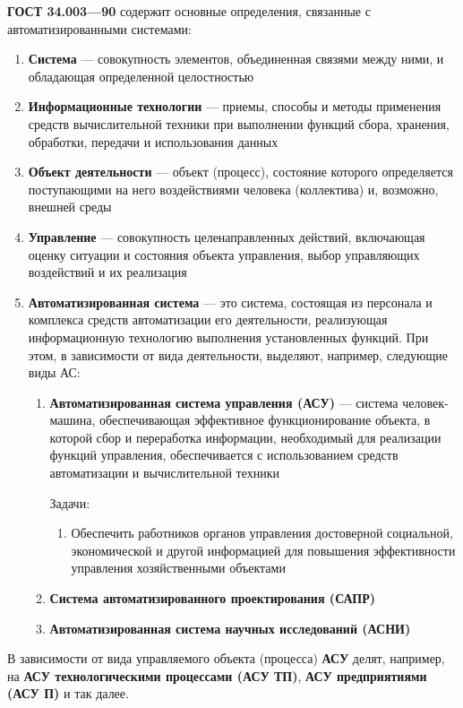 \documentclass{article}
\begin{document}
\textbf{ГОСТ 34.003—90} содержит основные определения, связанные с автоматизированными системами:

\begin{enumerate}
    \item \textbf{Система} — совокупность элементов, объединенная связями между ними, и обладающая определенной целостностью
    \item \textbf{Информационные технологии} — приемы, способы и методы применения средств вычислительной техники при выполнении функций сбора, хранения, обработки, передачи и использования данных
    \item \textbf{Объект деятельности} — объект (процесс), состояние которого определяется поступающими на него воздействиями человека (коллектива) и, возможно, внешней среды
    \item \textbf{Управление} — совокупность целенаправленных действий, включающая оценку ситуации и состояния объекта управления, выбор управляющих воздействий и их реализация
    \item \textbf{Автоматизированная система} — это система, состоящая из персонала и комплекса средств автоматизации его деятельности, реализующая информационную технологию выполнения установленных функций. При этом, в зависимости от вида деятельности, выделяют, например, следующие виды АС:
    \begin{enumerate}
        \item \textbf{Автоматизированная система управления (АСУ)} — система человек-машина, обеспечивающая эффективное функционирование объекта, в которой сбор и переработка информации, необходимый для реализации функций управления, обеспечивается с использованием средств автоматизации и вычислительной техники

        Задачи:
        \begin{enumerate}
            \item Обеспечить работников органов управления достоверной социальной, экономической и другой информацией для повышения эффективности управления хозяйственными объектами
        \end{enumerate}
        \item \textbf{Система автоматизированного проектирования (САПР)}
        \item \textbf{Автоматизированная система научных исследований (АСНИ)}
    \end{enumerate}
\end{enumerate}

В зависимости от вида управляемого объекта (процесса) \textbf{АСУ} делят, например, на \textbf{АСУ технологическими процессами (АСУ ТП)}, \textbf{АСУ предприятиями (АСУ П)} и так далее. \\[1 mm]
\end{document}

